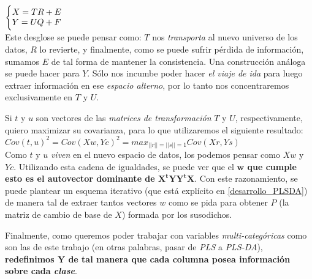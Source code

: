 $\Bigg\{
\begin{array}{@{}ll@{}}
	X = TR + E \\
	Y = UQ + F
\end{array}$ \\

Este desglose se puede pensar como: $T$ nos \textit{transporta} al nuevo universo de los datos, $R$ lo revierte, y finalmente, como se puede sufrir p\'erdida de informaci\'on, sumamos $E$ de tal forma de mantener la consistencia. Una construcci\'on an\'aloga se puede hacer para $Y$. S\'olo nos incumbe poder hacer \textit{el viaje de ida} para luego extraer informaci\'on en ese \textit{espacio alterno}, por lo tanto nos concentraremos exclusivamente en $T$ y $U$.

Si $t$ y $u$ son vectores de las \textit{matrices de transformaci\'on} $T$ y $U$, respectivamente, quiero maximizar su covarianza, para lo que utilizaremos el siguiente resultado: \\


$Cov(t, u)^{2} = Cov(Xw, Yc)^{2} = max_{\vert \vert r \vert \vert = \vert \vert s \vert \vert = 1} Cov(Xr, Ys)$ \\

Como $t$ y $u$ \textit{viven} en el nuevo espacio de datos, los podemos pensar como $Xw$ y $Yc$. Utilizando esta cadena de igualdades, se puede ver que el \textbf{$\mathbf{w}$ que cumple esto es el autovector dominante de $\mathbf{X^{t}YY^{t}X}$}. Con este razonamiento, se puede plantear un esquema iterativo (que est\'a expl\'icito en \ref{desarrollo_PLSDA}) de manera tal de extraer tantos vectores $w$ como se pida para obtener $P$ (la matriz de cambio de base de $X$) formada por los susodichos.

Finalmente, como queremos poder trabajar con variables \textit{multi-categ\'oricas} como son las de este trabajo (en otras palabras, pasar de \textit{PLS} a \textit{PLS-DA}), \textbf{redefinimos $\mathbf{Y}$ de tal manera que cada columna posea informaci\'on sobre cada \textit{clase}}.